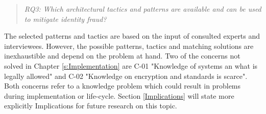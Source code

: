 \begin{quote}\emph{RQ3: Which architectural tactics and patterns are available and can be used to mitigate identity fraud?}\end{quote}
The selected patterns and tactics are based on the input of consulted experts and interviewees. However, the possible patterns, tactics and matching solutions are inexhaustible and depend on the problem at hand. Two of the concerns not solved in Chapter \ref{s:Implementation} are C-01 "Knowledge of systems an what is legally allowed" and C-02 "Knowledge on encryption and standards is scarce". Both concerns refer to a knowledge problem which could result in problems during implementation or life-cycle. Section \ref{Implications} will state more explicitly  Implications for future research on this topic.

